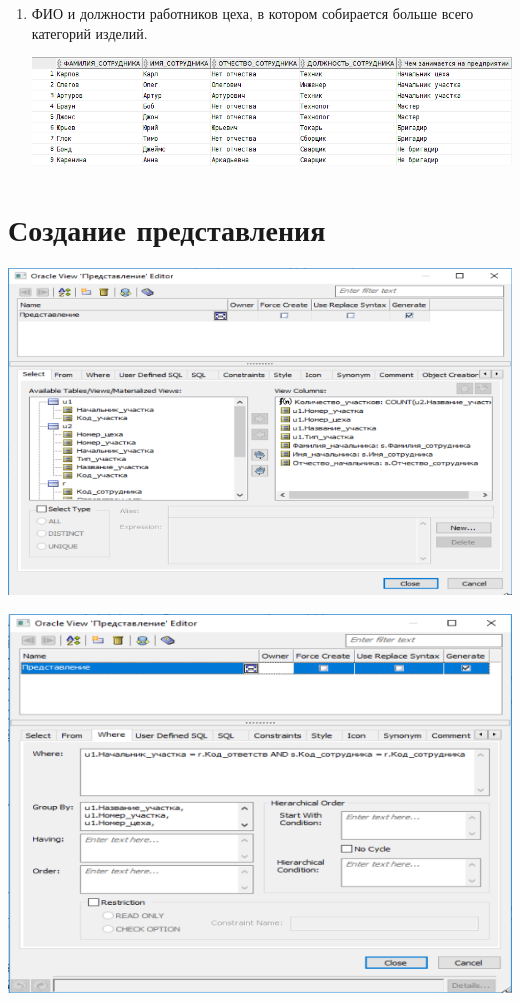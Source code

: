 \begin{enumerate}
    \item ФИО и должности работников цеха, в котором собирается больше всего категорий изделий.

    

    \includegraphics[width=16cm]{./screenshots/results/result10.png}

\end{enumerate}

\section{Создание представления}

\includegraphics[width=16cm]{./screenshots/view/select_page.png}

\includegraphics[width=16cm]{./screenshots/view/where_page.png}

